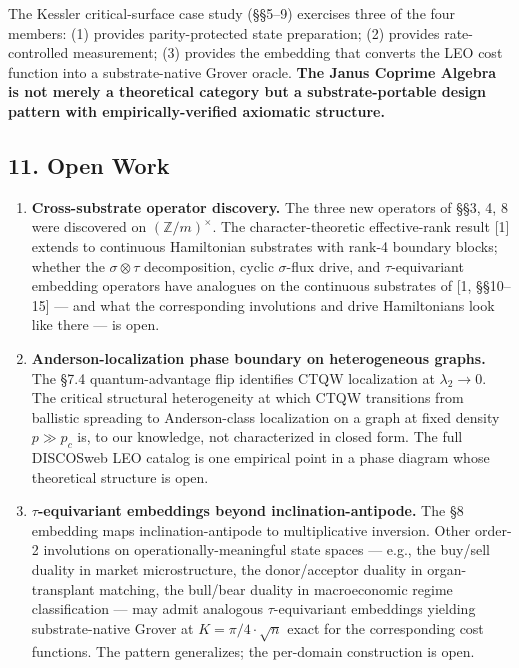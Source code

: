 \documentclass[
]{article}
\begin{document}
The Kessler critical-surface case study (§§5--9) exercises three of the
four members: (1) provides parity-protected state preparation; (2)
provides rate-controlled measurement; (3) provides the embedding that
converts the LEO cost function into a substrate-native Grover oracle.
\textbf{The Janus Coprime Algebra is not merely a theoretical category
but a substrate-portable design pattern with empirically-verified
axiomatic structure.}

\subsection{11. Open Work}\label{open-work}

\begin{enumerate}
\def\labelenumi{\arabic{enumi}.}
\item
  \textbf{Cross-substrate operator discovery.} The three new operators
  of §§3, 4, 8 were discovered on \((\mathbb{Z}/m)^\times\). The
  character-theoretic effective-rank result {[}1{]} extends to
  continuous Hamiltonian substrates with rank-4 boundary blocks; whether
  the \(\sigma\otimes\tau\) decomposition, cyclic \(\sigma\)-flux drive,
  and \(\tau\)-equivariant embedding operators have analogues on the
  continuous substrates of {[}1, §§10--15{]} --- and what the
  corresponding involutions and drive Hamiltonians look like there ---
  is open.
\item
  \textbf{Anderson-localization phase boundary on heterogeneous graphs.}
  The §7.4 quantum-advantage flip identifies CTQW localization at
  \(\lambda_2 \to 0\). The critical structural heterogeneity at which
  CTQW transitions from ballistic spreading to Anderson-class
  localization on a graph at fixed density \(p \gg p_c\) is, to our
  knowledge, not characterized in closed form. The full DISCOSweb LEO
  catalog is one empirical point in a phase diagram whose theoretical
  structure is open.
\item
  \textbf{\(\tau\)-equivariant embeddings beyond inclination-antipode.}
  The §8 embedding maps inclination-antipode to multiplicative
  inversion. Other order-2 involutions on operationally-meaningful state
  spaces --- e.g., the buy/sell duality in market microstructure, the
  donor/acceptor duality in organ-transplant matching, the bull/bear
  duality in macroeconomic regime classification --- may admit analogous
  \(\tau\)-equivariant embeddings yielding substrate-native Grover at
  \(K = \pi/4 \cdot \sqrt{n}\) exact for the corresponding cost
  functions. The pattern generalizes; the per-domain construction is
  open.
\end{enumerate}
\end{document}
